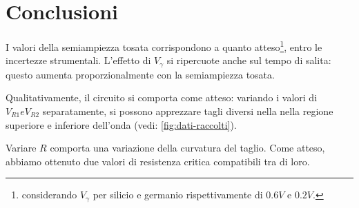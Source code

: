 \section{Conclusioni}\label{sec:conclusioni}
I valori della semiampiezza tosata corrispondono a quanto atteso\footnote{considerando $V_\gamma$ per silicio e germanio
rispettivamente di $0.6V$ e $0.2V$.}, entro
le incertezze strumentali. L'effetto di $V_\gamma$ si ripercuote anche
sul tempo di salita: questo aumenta proporzionalmente con la semiampiezza tosata.

Qualitativamente, il circuito si comporta come atteso: variando i valori di
$V_{R1} e V_{R2}$ separatamente, si possono apprezzare tagli diversi nella
nella regione superiore e inferiore dell'onda (vedi: \ref{fig:dati-raccolti}).

Variare $R$ comporta una variazione della curvatura del taglio.
Come atteso, abbiamo ottenuto due valori di resistenza critica compatibili
tra di loro.
